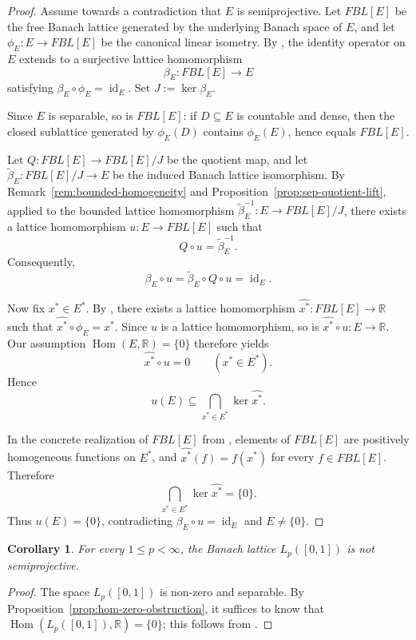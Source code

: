 \documentclass[11pt]{amsart}
\renewcommand{\le}{\leqslant}
\numberwithin{equation}{section}
\newtheorem{corollary}[theorem]{Corollary}
\theoremstyle{definition}
\theoremstyle{remark}
\theoremstyle{plain}
\DeclareMathOperator{\Hom}{Hom}
\DeclareMathOperator{\id}{id}
\begin{document}
\begin{proof}
Assume towards a contradiction that \(E\) is semiprojective.
Let \(FBL[E]\) be the free Banach lattice generated by the underlying Banach space of \(E\),
and let \(\phi_E\colon E\to FBL[E]\) be the canonical linear isometry.
By \cite[Definition~2.2 and Theorem~2.4]{aviles-fblE}, the identity operator on \(E\)
extends to a surjective lattice homomorphism
\[
\beta_E\colon FBL[E]\to E
\]
satisfying \(\beta_E\circ \phi_E=\id_E\).
Set \(J:=\ker \beta_E\).

Since \(E\) is separable, so is \(FBL[E]\): if \(D\subseteq E\) is countable and dense, then
the closed sublattice generated by \(\phi_E(D)\) contains \(\phi_E(E)\), hence equals \(FBL[E]\).

Let \(Q\colon FBL[E]\to FBL[E]/J\) be the quotient map, and let
\(\widetilde\beta_E\colon FBL[E]/J\to E\) be the induced Banach lattice isomorphism.
By Remark~\ref{rem:bounded-homogeneity} and
Proposition~\ref{prop:sep-quotient-lift}, applied to the bounded lattice homomorphism
\(\widetilde\beta_E^{-1}\colon E\to FBL[E]/J\),
there exists a lattice homomorphism \(u\colon E\to FBL[E]\) such that
\[
Q\circ u=\widetilde\beta_E^{-1}.
\]
Consequently,
\[
\beta_E\circ u=\widetilde\beta_E\circ Q\circ u=\id_E.
\]

Now fix \(x^*\in E^*\).
By \cite[Theorem~2.4]{aviles-fblE}, there exists a lattice homomorphism
\(\widehat{x^*}\colon FBL[E]\to\mathbb R\) such that
\(\widehat{x^*}\circ \phi_E=x^*\).
Since \(u\) is a lattice homomorphism, so is \(\widehat{x^*}\circ u\colon E\to\mathbb R\).
Our assumption \(\Hom(E,\mathbb R)=\{0\}\) therefore yields
\[
\widehat{x^*}\circ u=0
\qquad (x^*\in E^*).
\]
Hence
\[
u(E)\subseteq \bigcap_{x^*\in E^*}\ker \widehat{x^*}.
\]

In the concrete realization of \(FBL[E]\) from \cite[Definition~2.2]{aviles-fblE},
elements of \(FBL[E]\) are positively homogeneous functions on \(E^*\), and
\(\widehat{x^*}(f)=f(x^*)\) for every \(f\in FBL[E]\).
Therefore
\[
\bigcap_{x^*\in E^*}\ker \widehat{x^*}=\{0\}.
\]
Thus \(u(E)=\{0\}\), contradicting \(\beta_E\circ u=\id_E\) and \(E\neq\{0\}\).
\end{proof}

\begin{corollary}\label{cor:Lp-unit-interval-not-semi}
For every \(1\le p<\infty\), the Banach lattice \(L_p([0,1])\) is not semiprojective.
\end{corollary}

\begin{proof}
The space \(L_p([0,1])\) is non-zero and separable.
By Proposition~\ref{prop:hom-zero-obstruction}, it suffices to know that
\(\Hom(L_p([0,1]),\mathbb R)=\{0\}\); this follows from \cite[Example 1(iii)]{dantas2022}.
\end{proof}
\end{document}
